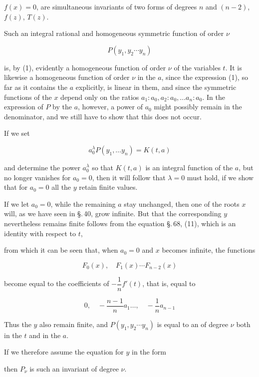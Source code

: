 $f(x) = 0$, are simultaneous invariants of two forms of degrees $n$ and
$(n-2)$, $f(z)$, $T(z)$.

Such an integral rational and homogeneous symmetric
function of order $\nu$

\[
P(y_1, y_2 \cdots y_n)
\]

is, by (1), evidently a homogeneous function of order $\nu$ of the
variables $t$. It is likewise a homogeneous function of order $\nu$
in the $a$, since the expression (1), so far as it contains the $a$ explicitly,
is linear in them, and since the symmetric functions of the $x$ depend only
on the ratios $a_1 : a_0, a_2 : a_0, \ldots a_n : a_0$. In the
expression of $P$ by the $a$, however, a power of $a_0$ might possibly
remain in the denominator, and we still have to show
that this does not occur.

If we set

\[
a_0^{\lambda} P(y_1, \ldots y_n) = K(t, a)
\]

and determine the power $a_0^{\lambda}$ so that $K(t, a)$ is an integral function
of the $a$, but no longer vanishes for $a_0 = 0$, then it
will follow that $\lambda = 0$ must hold, if we show that for
$a_0 = 0$ all the $y$ retain finite values.

If we let $a_0 = 0$, while the remaining $a$ stay
unchanged, then one of the roots $x$ will, as we have seen in
\S.\,40, grow infinite. But that the corresponding
$y$ nevertheless remains finite follows from the equation
\S.\,68, (11), which is an identity with respect to $t$,


from which it can be seen that, when $a_0 = 0$ and $x$ becomes infinite,
the functions

\[
F_0(x), \quad F_1(x) \cdots F_{n-2}(x)
\]

become equal to the coefficients of $-\dfrac{1}{n}f'(t)$, that is, equal to

\[
0, \quad -\frac{n-1}{n}a_1 \ldots, \quad -\frac{1}{n}a_{n-1}
\]

Thus the $y$ also remain finite, and $P(y_1, y_2 \cdots y_n)$
is equal to an  of degree $\nu$
both in the $t$ and in the $a$.

If we therefore assume the equation for $y$ in the form


then $P_{\nu}$ is such an invariant of degree $\nu$.
